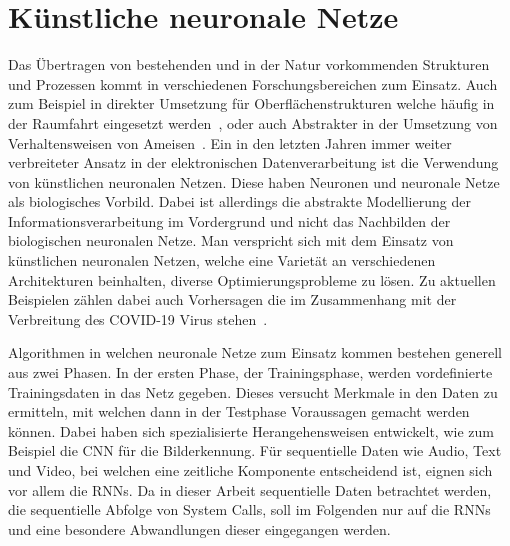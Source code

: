     \section{Künstliche neuronale Netze}\label{sec:KNN}        
        Das Übertragen von bestehenden und in der Natur vorkommenden Strukturen und Prozessen kommt in verschiedenen Forschungsbereichen zum Einsatz.
        Auch zum Beispiel in direkter Umsetzung für Oberflächenstrukturen welche häufig in der Raumfahrt eingesetzt werden~\cite{GECKO}, oder auch Abstrakter in der Umsetzung von Verhaltensweisen von Ameisen~\cite{ANT}.
        Ein in den letzten Jahren immer weiter verbreiteter Ansatz in der elektronischen Datenverarbeitung ist die Verwendung von künstlichen neuronalen Netzen.
        Diese haben Neuronen und neuronale Netze als biologisches Vorbild.
        Dabei ist allerdings die abstrakte Modellierung der Informationsverarbeitung im Vordergrund und nicht das Nachbilden der biologischen neuronalen Netze.
        Man verspricht sich mit dem Einsatz von künstlichen neuronalen Netzen, welche eine Varietät an verschiedenen Architekturen beinhalten, diverse Optimierungsprobleme zu lösen.
        Zu aktuellen Beispielen zählen dabei auch Vorhersagen die im Zusammenhang mit der Verbreitung des COVID-19 Virus stehen~\cite{COVID1, COVID2, COVID3}.
        
        Algorithmen in welchen neuronale Netze zum Einsatz kommen bestehen generell aus zwei Phasen. 
        In der ersten Phase, der Trainingsphase, werden vordefinierte Trainingsdaten in das Netz gegeben.
        Dieses versucht Merkmale in den Daten zu ermitteln, mit welchen dann in der Testphase Voraussagen gemacht werden können.
        Dabei haben sich spezialisierte Herangehensweisen entwickelt, wie zum Beispiel die \ac{CNN} für die Bilderkennung. 
        Für sequentielle Daten wie Audio, Text und Video, bei welchen eine zeitliche Komponente entscheidend ist, eignen sich vor allem die \ac{RNN}s.
        Da in dieser Arbeit sequentielle Daten betrachtet werden, die sequentielle Abfolge von System Calls, soll im Folgenden nur auf die \ac{RNN}s und eine besondere Abwandlungen dieser eingegangen werden.
